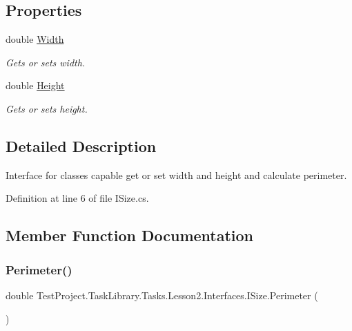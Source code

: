 \subsection*{Properties}
\begin{DoxyCompactItemize}
\item 
double \mbox{\hyperlink{interface_test_project_1_1_task_library_1_1_tasks_1_1_lesson2_1_1_interfaces_1_1_i_size_aa748b4608b3f57247cce2fb7c542aa43}{Width}}
\begin{DoxyCompactList}\small\item\em Gets or sets width. \end{DoxyCompactList}\item 
double \mbox{\hyperlink{interface_test_project_1_1_task_library_1_1_tasks_1_1_lesson2_1_1_interfaces_1_1_i_size_a7f1aebc02b225fc8dff88bcdab1521c1}{Height}}
\begin{DoxyCompactList}\small\item\em Gets or sets height. \end{DoxyCompactList}\end{DoxyCompactItemize}


\subsection{Detailed Description}
Interface for classes capable get or set width and height and calculate perimeter. 



Definition at line 6 of file I\+Size.\+cs.



\subsection{Member Function Documentation}
\mbox{\label{interface_test_project_1_1_task_library_1_1_tasks_1_1_lesson2_1_1_interfaces_1_1_i_size_ae71775505cb328d37ab5d5bc16fc79c7}} 
\subsubsection{\texorpdfstring{Perimeter()}{Perimeter()}}
{\footnotesize\ttfamily double Test\+Project.\+Task\+Library.\+Tasks.\+Lesson2.\+Interfaces.\+I\+Size.\+Perimeter (\begin{DoxyParamCaption}{ }\end{DoxyParamCaption})}



